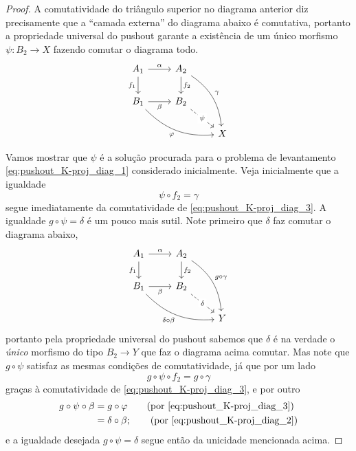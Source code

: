 \begin{proof}
  A comutatividade do triângulo superior no diagrama anterior diz precisamente que a ``camada externa'' do diagrama abaixo é comutativa, portanto a propriedade universal do pushout garante a existência de um único morfismo $\psi: B_2 \to X$ fazendo comutar o diagrama todo.
  \begin{equation}\label{eq:pushout_K-proj_diag_3}
    \begin{tikzcd}
      A_1
      \arrow[r, "\alpha"]
      \arrow[d, "f_1" swap]
      & A_2
      \arrow[d, "f_2"]
      \arrow[rdd, bend left=25, "\gamma"]
      \\ B_1
      \arrow[r, "\beta" swap]
      \arrow[rrd, bend right=25, "\varphi" swap]
      & B_2
      \arrow[rd, dashed, "\psi" description]
      \\ & & X
    \end{tikzcd}
  \end{equation}

  Vamos mostrar que $\psi$ é a solução procurada para o problema de levantamento \eqref{eq:pushout_K-proj_diag_1} considerado inicialmente.
  Veja inicialmente que a igualdade
  \begin{displaymath}
    \psi \circ f_2 = \gamma
  \end{displaymath}
  segue imediatamente da comutatividade de \eqref{eq:pushout_K-proj_diag_3}.
  A igualdade $g \circ \psi = \delta$ é um pouco mais sutil.
  Note primeiro que $\delta$ faz comutar o diagrama abaixo,
  \begin{displaymath}
    \begin{tikzcd}
      A_1
      \arrow[r, "\alpha"]
      \arrow[d, "f_1" swap]
      & A_2
      \arrow[d, "f_2"]
      \arrow[rdd, bend left=25, "g \circ \gamma"]
      \\ B_1
      \arrow[r, "\beta" swap]
      \arrow[rrd, bend right=25, "\delta \circ \beta" swap]
      & B_2
      \arrow[rd, dashed, "\delta" description]
      \\ & & Y
    \end{tikzcd}
  \end{displaymath}
  portanto pela propriedade universal do pushout sabemos que $\delta$ é na verdade o \emph{único} morfismo do tipo $B_2 \to Y$ que faz o diagrama acima comutar.
  Mas note que $g \circ \psi$ satisfaz as mesmas condições de comutatividade, já que por um lado
  \begin{displaymath}
    g \circ \psi \circ f_2 = g \circ \gamma
  \end{displaymath}
  graças à comutatividade de \eqref{eq:pushout_K-proj_diag_3}, e por outro
  \begin{align*}
    g \circ \psi \circ \beta
    & = g \circ \varphi
    \tag{por \eqref{eq:pushout_K-proj_diag_3}} \\
    & = \delta \circ \beta;
    \tag{por \eqref{eq:pushout_K-proj_diag_2}}
  \end{align*}
  e a igualdade desejada $g \circ \psi = \delta$ segue então da unicidade mencionada acima.


\end{proof}
